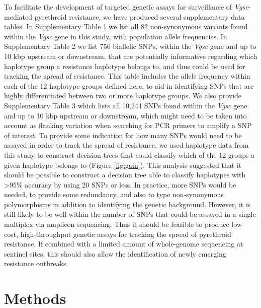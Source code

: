 \documentclass[a4paper,11pt,abstracton,hidelinks]{scrartcl}
\begin{document}
%
To facilitate the development of targeted genetic assays for surveillance of \textit{Vgsc}-mediated pyrethroid resistance, we have produced several supplementary data tables.
%
In Supplementary Table 1 we list all 82 non-synonymous variants found within the \textit{Vgsc} gene in this study, with population allele frequencies.
%
In Supplementary Table 2 we list 756 biallelic SNPs, within the \textit{Vgsc} gene and up to 10 kbp upstream or downstream, that are potentially informative regarding which haplotype group a resistance haplotype belongs to, and thus could be used for tracking the spread of resistance.
%
This table includes the allele frequency within each of the 12 haplotype groups defined here, to aid in identifying SNPs that are highly differentiated between two or more haplotype groups.
%
We also provide Supplementary Table 3 which lists all 10,244 SNPs found within the \textit{Vgsc} gene and up to 10 kbp upstream or downstream, which might need to be taken into account as flanking variation when searching for PCR primers to amplify a SNP of interest.
%
To provide some indication for how many SNPs would need to be assayed in order to track the spread of resistance, we used haplotype data from this study to construct decision trees that could classify which of the 12 groups a given haplotype belongs to (Figure \ref{fig:gain}).
%
This analysis suggested that it should be possible to construct a decision tree able to classify haplotypes with >95\% accuracy by using 20 SNPs or less.
%
In practice, more SNPs would be needed, to provide some redundancy, and also to type non-synonymous polymorphisms in addition to identifying the genetic background.
%
However, it is still likely to be well within the number of SNPs that could be assayed in a single multiplex via amplicon sequencing.
%
Thus it should be feasible to produce low-cost, high-throughput genetic assays for tracking the spread of pyrethroid resistance.
%
If combined with a limited amount of whole-genome sequencing at sentinel sites, this should also allow the identification of newly emerging resistance outbreaks.
%


\section*{Methods}


\end{document}
